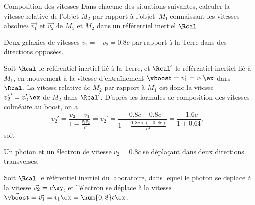 \begin{exo}[PC][1][appli]{Composition des vitesses}
  \hauteurLargeurCadreReponse{8mm}{\textwidth}
   Dans chacune des situations suivantes, calculer la vitesse relative de l’objet $M_2$ par rapport à l’objet~$M_1$ connaissant les vitesses absolues $\Vec{v_1}$ et $\Vec{v_2}$ de $M_1$ et $M_2$ dans un référentiel inertiel $\Rcal$.


  \begin{enonce}
  	Deux galaxies de vitesses $v_1 = -v_2 = \num{0.8}c$ par rapport à la Terre dans des directions opposées.
    
  \end{enonce}


  \begin{corrige}
    Soit $\Rcal$ le référentiel inertiel lié à la Terre, et
   $\Rcal'$ le référentiel inertiel lié à $M_1$, en mouvement à la vitesse d'entraînement $\Vec{\vboost} = \Vec{v_1} = v_1 \ex$ dans $\Rcal$. La vitesse relative de $M_2$ par rapport à $M_1$ est donc la vitesse $\Vec{v_2}' = v_2'\, \ex$ de $M_2$ dans $\Rcal'$. D'après les formules de composition des vitesses colinéaire au boost, on a
    $$
    v_2' = \frac{v_2 - v_1}{1 - \frac{v_1 v_2}{c^2}} =
    v_2' = \frac{-\num{0,8} c - \num{0,8} c}{1 - \frac{0,8 c \times (-0,8 c)}{c^2}} = \frac{-\num{1,6} c}{1 + \num{0,64}},
    $$
    soit 
    
  \end{corrige}
  \begin{enonce}
  	Un photon et un électron de vitesse $v_2=\num{0.8}c$ se déplaçant dans deux directions transverses.
      
  \end{enonce}


  \begin{corrige}
    Soit $\Rcal$ le référentiel inertiel du laboratoire, dans lequel le photon se déplace à la vitesse $\Vec{v_2} = c \ey$, et l'électron se déplace à la vitesse $\Vec{\vboost} = \Vec{v_1} = v_1 \ex = \num{0,8} c \ex$. 
    

\end{corrige}
\end{exo}

